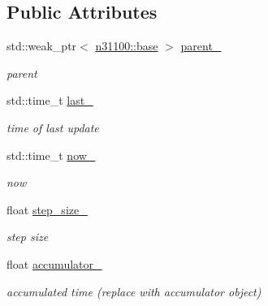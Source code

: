 \subsection*{Public Attributes}
\begin{DoxyCompactItemize}
\item 
std::weak\_\-ptr$<$ \hyperlink{classnebula_1_1content_1_1universe_1_1admin_1_1base}{n31100::base} $>$ \hyperlink{classnebula_1_1content_1_1scene_1_1admin_1_1base_a91e57c35622d576b5a454f406a425c61}{parent\_\-}
\begin{DoxyCompactList}\small\item\em parent \item\end{DoxyCompactList}\item 
std::time\_\-t \hyperlink{classnebula_1_1content_1_1scene_1_1admin_1_1base_a1a951e1694ac47330dd9869a27ded37b}{last\_\-}
\begin{DoxyCompactList}\small\item\em time of last update \item\end{DoxyCompactList}\item 
std::time\_\-t \hyperlink{classnebula_1_1content_1_1scene_1_1admin_1_1base_a58370706ad19666ed6d1bf43ad7d2dce}{now\_\-}
\begin{DoxyCompactList}\small\item\em now \item\end{DoxyCompactList}\item 
float \hyperlink{classnebula_1_1content_1_1scene_1_1admin_1_1base_a6295f7c5b915ef50dfd1a50399cef6df}{step\_\-size\_\-}
\begin{DoxyCompactList}\small\item\em step size \item\end{DoxyCompactList}\item 
float \hyperlink{classnebula_1_1content_1_1scene_1_1admin_1_1base_a528fa59c8e53e163df45cccd014acb92}{accumulator\_\-}
\begin{DoxyCompactList}\small\item\em accumulated time (replace with accumulator object) \item\end{DoxyCompactList}\end{DoxyCompactItemize}
